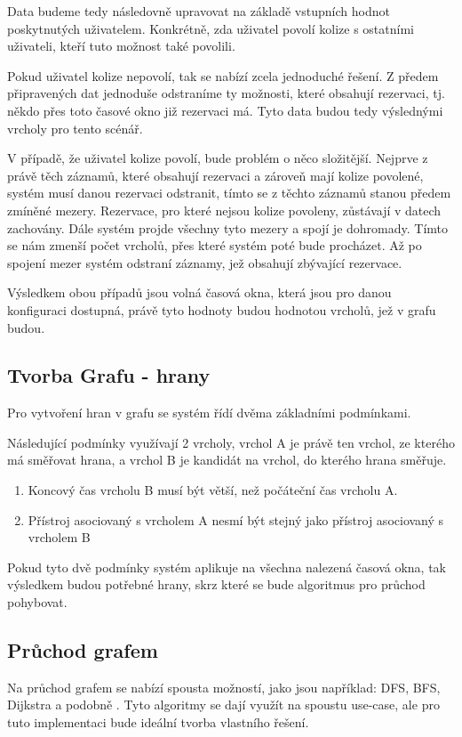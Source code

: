 Data budeme tedy následovně upravovat na základě vstupních hodnot poskytnutých uživatelem. Konkrétně, zda uživatel povolí kolize s ostatními uživateli, kteří tuto možnost také povolili.

Pokud uživatel kolize nepovolí, tak se nabízí zcela jednoduché řešení. Z předem připravených dat jednoduše odstraníme ty možnosti, které obsahují rezervaci, tj. někdo přes toto časové okno již rezervaci má. Tyto data budou tedy výslednými vrcholy pro tento scénář.

V případě, že uživatel kolize povolí, bude problém o něco složitější. Nejprve z právě těch záznamů, které obsahují rezervaci a zároveň mají kolize povolené, systém musí danou rezervaci odstranit, tímto se z těchto záznamů stanou předem zmíněné mezery. Rezervace, pro které nejsou kolize povoleny, zůstávají v datech zachovány. Dále systém projde všechny tyto mezery a spojí je dohromady.
Tímto se nám zmenší počet vrcholů, přes které systém poté bude procházet. Až po spojení mezer systém odstraní záznamy, jež obsahují zbývající rezervace.

Výsledkem obou případů jsou volná časová okna, která jsou pro danou konfiguraci dostupná, právě tyto hodnoty budou hodnotou vrcholů, jež v grafu budou.

\subsection{Tvorba Grafu - hrany}
Pro vytvoření hran v grafu se systém řídí dvěma základními podmínkami.

Následující podmínky využívají 2 vrcholy, vrchol A je právě ten vrchol, ze kterého má směřovat hrana, a vrchol B je kandidát na vrchol, do kterého hrana směřuje.
\begin{enumerate}
    \item Koncový čas vrcholu B musí být větší, než počáteční čas vrcholu A.
    \item Přístroj asociovaný s vrcholem A nesmí být stejný jako přístroj asociovaný s vrcholem B
\end{enumerate}

Pokud tyto dvě podmínky systém aplikuje na všechna nalezená časová okna, tak výsledkem budou potřebné hrany, skrz které se bude algoritmus pro průchod pohybovat.


\subsection{Průchod grafem}
Na průchod grafem se nabízí spousta možností, jako jsou například: DFS, BFS, Dijkstra a podobně \cite{tarjan1972depth, bundy1984breadth, javaid2013understanding}. Tyto algoritmy se dají využít na spoustu use-case, ale pro tuto implementaci bude ideální tvorba vlastního řešení.

